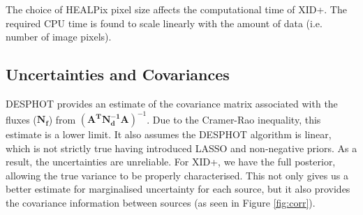 \documentclass[useAMS,usenatbib]{mnras}
\begin{document}

The choice of HEALPix pixel size affects the computational time of \textsc{XID+}. The required CPU time is found to scale linearly with the amount of data (i.e. number of image pixels).%

\subsection{Uncertainties and Covariances}
\textsc{DESPHOT} provides an estimate of the covariance matrix associated with the fluxes ($\mathbf{N_f}$) from $(\mathbf{A^TN_d^{-1}A})^{-1}$. Due to the Cramer-Rao inequality, this estimate is a lower limit. It also assumes the \textsc{DESPHOT} algorithm is linear, which is not strictly true having introduced LASSO and non-negative priors. As a result, the uncertainties are unreliable. For \textsc{XID+}, we have the full posterior, allowing the true variance to be properly characterised. This not only gives us a better estimate for marginalised uncertainty for each source, but it also provides the covariance information between sources (as seen in Figure \ref{fig:corr}). 
%

\end{document}
